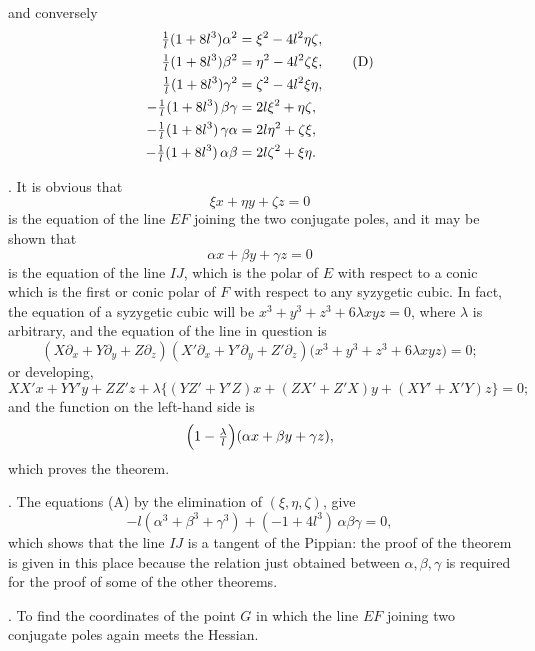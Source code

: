\documentclass[11pt]{article}
\begin{document}
and conversely
\begin{align}
\tfrac{1}{l}(1 + 8 l^3) \alpha^2 &= \xi^2 - 4 l^2 \eta\zeta, \notag \\
\tfrac{1}{l}(1 + 8 l^3) \beta^2  &= \eta^2 - 4 l^2 \zeta\xi, \tag{D}\\
\tfrac{1}{l}(1 + 8 l^3) \gamma^2 &= \zeta^2 - 4 l^2 \xi\eta, \notag \\
-\tfrac{1}{l}(1 + 8 l^3)\,\beta\gamma &= 2 l \xi^2 + \eta\zeta, \\
-\tfrac{1}{l}(1 + 8 l^3)\,\gamma\alpha &= 2 l \eta^2 + \zeta\xi, \\
-\tfrac{1}{l}(1 + 8 l^3)\,\alpha\beta &= 2 l \zeta^2 + \xi\eta.
\end{align}

\medskip

. It is obvious that
\[
\xi x + \eta y + \zeta z = 0
\]
is the equation of the line $EF$ joining the two conjugate poles, and it may be shown that
\[
\alpha x + \beta y + \gamma z = 0
\]
is the equation of the line $IJ$, which is the polar of $E$ with respect to a conic which is the first or conic polar of $F$ with respect to any syzygetic cubic. In fact, the equation of a syzygetic cubic will be $x^3 + y^3 + z^3 + 6 \lambda x y z = 0$, where $\lambda$ is arbitrary, and the equation of the line in question is
\[
(X \partial_x + Y \partial_y + Z \partial_z)(X' \partial_x + Y' \partial_y + Z' \partial_z)\bigl(x^3 + y^3 + z^3 + 6 \lambda x y z\bigr) = 0;
\]
or developing,
\[
X X' x + Y Y' y + Z Z' z + \lambda \bigl\{ (Y Z' + Y' Z) x + (Z X' + Z' X) y + (X Y' + X' Y) z \bigr\} = 0;
\]
and the function on the left-hand side is
\[
\Bigl(1 - \tfrac{\lambda}{l}\Bigr)(\alpha x + \beta y + \gamma z),
\]
which proves the theorem.

\medskip

. The equations (A) by the elimination of $(\xi, \eta, \zeta)$, give
\[
-l(\alpha^3 + \beta^3 + \gamma^3) + (-1 + 4 l^3)\,\alpha\beta\gamma = 0,
\]
which shows that the line $IJ$ is a tangent of the Pippian: the proof of the theorem is given in this place because the relation just obtained between $\alpha, \beta, \gamma$ is required for the proof of some of the other theorems.

\medskip

. To find the coordinates of the point $G$ in which the line $EF$ joining two conjugate poles again meets the Hessian.
\end{document}
